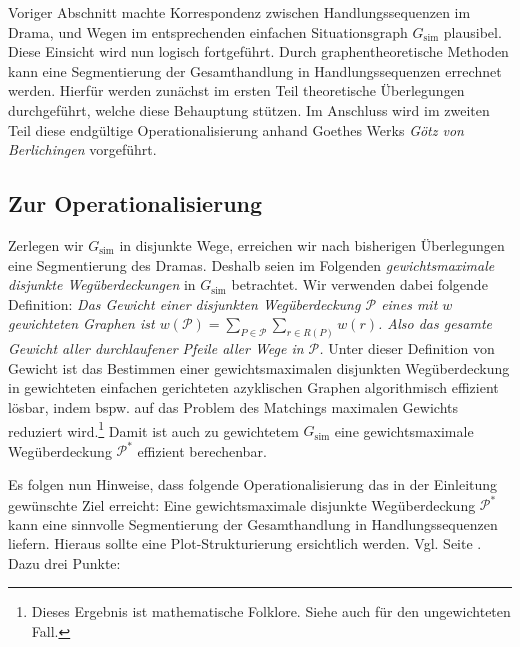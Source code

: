 \documentclass[a4paper,10pt,abstract=true,headings=small]{scrartcl}
\begin{document}
Voriger Abschnitt machte Korrespondenz zwischen Handlungssequenzen im Drama, und Wegen im entsprechenden einfachen Situationsgraph $G_\text{sim}$ plausibel.
Diese Einsicht wird nun logisch fortgeführt.
Durch graphentheoretische Methoden kann eine Segmentierung der Gesamthandlung in Handlungssequenzen errechnet werden.
Hierfür werden zunächst im ersten Teil theoretische Überlegungen durchgeführt, welche diese Behauptung stützen.
Im Anschluss wird im zweiten Teil diese endgültige Operationalisierung anhand Goethes Werks \emph{Götz von Berlichingen} vorgeführt.

\subsection{Zur Operationalisierung}

Zerlegen wir $G_\text{sim}$ in disjunkte Wege, erreichen wir nach bisherigen Überlegungen eine Segmentierung des Dramas.
Deshalb seien im Folgenden \emph{gewichtsmaximale disjunkte Wegüberdeckungen} in $G_\text{sim}$ betrachtet.
Wir verwenden dabei folgende Definition:
\emph{Das Gewicht einer disjunkten Wegüberdeckung $\mathcal{P}$ eines mit $w$ gewichteten Graphen ist $w(\mathcal{P}) = \sum_{P\in\mathcal{P}} \sum_{r\in R(P)} w(r)$. Also das gesamte Gewicht aller durchlaufener Pfeile aller Wege in $\mathcal{P}$.}
Unter dieser Definition von Gewicht ist das Bestimmen einer gewichtsmaximalen disjunkten Wegüberdeckung in gewichteten einfachen gerichteten azyklischen Graphen algorithmisch effizient lösbar, indem bspw. auf das Problem des Matchings maximalen Gewichts reduziert wird.\footnote{Dieses Ergebnis ist mathematische Folklore. Siehe auch \cite[761]{cormen_introduction_2009} für den ungewichteten Fall.}
Damit ist auch zu gewichtetem $G_\text{sim}$ eine gewichtsmaximale Wegüberdeckung $\mathcal{P}^*$ effizient berechenbar.

Es folgen nun Hinweise, dass folgende Operationalisierung das in der Einleitung gewünschte Ziel erreicht:
Eine gewichtsmaximale disjunkte Wegüberdeckung $\mathcal{P}^*$ kann eine sinnvolle Segmentierung der Gesamthandlung in Handlungssequenzen liefern.
Hieraus sollte eine Plot-Strukturierung ersichtlich werden.
Vgl. Seite \pageref{page:plot-segmentierung}.
Dazu drei Punkte:
\end{document}
